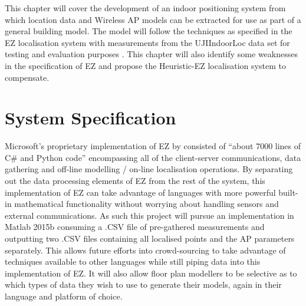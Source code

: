 \documentclass{UoYCSproject}
\begin{document}
		This chapter will cover the development of an indoor positioning system from which location data and Wireless AP models can be extracted for use as part of a general building model. The model will follow the techniques as specified in the EZ localisation system \citep{chintalapudi2010indoor} with measurements from the UJIIndoorLoc data set for testing and evaluation purposes \citep{torres2014ujiindoorloc}. This chapter will also identify some weaknesses in the specification of EZ and propose the Heuristic-EZ localisation system to compensate.
		
		\section{System Specification}
        \label{sec:sysspec}
            
            Microsoft's proprietary implementation of EZ by \citeauthor{chintalapudi2010indoor} consisted of ``about 7000 lines of C\# and Python code'' encompassing all of the client-server communications, data gathering and off-line modelling / on-line localisation operations. By separating out the data processing elements of EZ from the rest of the system, this implementation of EZ can take advantage of languages with more powerful built-in mathematical functionality without worrying about handling sensors and external communications. As such this project will pursue an implementation in Matlab 2015b consuming a .CSV file of pre-gathered measurements and outputting two .CSV files containing all localised points and the AP parameters separately. This allows future efforts into crowd-sourcing to take advantage of techniques available to other languages while still piping data into this implementation of EZ. It will also allow floor plan modellers to be selective as to which types of data they wish to use to generate their models, again in their language and platform of choice.
            
\end{document}
